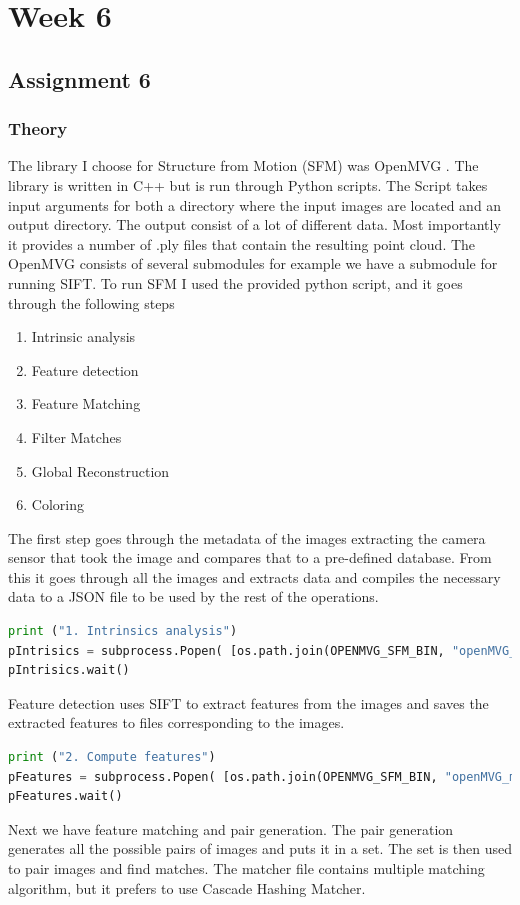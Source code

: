 \documentclass{article}
\begin{document}
    \section{Week 6}
    \subsection{Assignment 6}
    \subsubsection{Theory}
    The library I choose for Structure from Motion (SFM) was OpenMVG \cite{moulon2016openmvg}. The library is written in C++ but is run through Python scripts. The Script takes input arguments for both a directory where the input images are located and an output directory. The output consist of a lot of different data. Most importantly it provides a number of .ply files that contain the resulting point cloud. The OpenMVG consists of several submodules for example we have a submodule for running SIFT. To run SFM I used the provided python script, and it goes through the following steps
    \begin{enumerate}
        \item Intrinsic analysis
        \item Feature detection
        \item Feature Matching
        \item Filter Matches
        \item Global Reconstruction
        \item Coloring
    \end{enumerate}

    The first step goes through the metadata of the images extracting the camera sensor that took the image and compares that to a pre-defined database. From this it goes through all the images and extracts data and compiles the necessary data to a JSON file to be used by the rest of the operations.

    \begin{lstlisting}[language=python]
print ("1. Intrinsics analysis")
pIntrisics = subprocess.Popen( [os.path.join(OPENMVG_SFM_BIN, "openMVG_main_SfMInit_ImageListing"),  "-i", input_dir, "-o", matches_dir, "-d", camera_file_params] )
pIntrisics.wait()
    \end{lstlisting}
    Feature detection uses SIFT to extract features from the images and saves the extracted features to files corresponding to the images. 
    \begin{lstlisting}[language=python]
print ("2. Compute features")
pFeatures = subprocess.Popen( [os.path.join(OPENMVG_SFM_BIN, "openMVG_main_ComputeFeatures"),  "-i", matches_dir+"/sfm_data.json", "-o", matches_dir, "-m", "SIFT"] )
pFeatures.wait()
    \end{lstlisting}
    Next we have feature matching and pair generation. The pair generation generates all the possible pairs of images and puts it in a set. The set is then used to pair images and find matches. The matcher file contains multiple matching algorithm, but it prefers to use Cascade Hashing Matcher.
\end{document}
